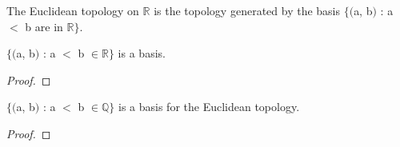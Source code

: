 \documentclass{article}
\begin{document}
	\begin{definition}
	The Euclidean topology on $\mathbb{R}$ is the topology generated by the basis $\lbrace($a, b$)$ : a $<$ b are in $\mathbb{R}\rbrace$.
	\end{definition}
	
	\begin{theorem}
	$\lbrace($a, b$)$ : a $<$ b $\in \mathbb{R}\rbrace$ is a basis.
	\end{theorem}
	\begin{proof}
	\end{proof}
	
	\begin{theorem}
	$\lbrace($a, b$)$ : a $<$ b $\in \mathbb{Q}\rbrace$ is a basis for the Euclidean topology.
	\end{theorem}
	\begin{proof}
	\end{proof}
	
\end{document}
